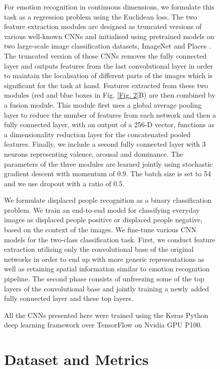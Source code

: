 \documentclass[10pt,twocolumn,letterpaper]{article}
\begin{document}
\begin{figure}[t!]
For emotion recognition in continuous dimensions, we formulate this task as a regression problem using the Euclidean loss. The two feature extraction modules are designed as truncated versions of various well-known CNNs and initialised using pretrained models on two large-scale image classification datasets, ImageNet \cite{krizhevsky2012imagenet} and Places \cite{zhou2018places}. The truncated version of those CNNs removes the fully connected layer and outputs features from the last convolutional layer in order to maintain the localisation of different parts of the images which is significant for the task at hand. Features extracted from these two modules (red and blue boxes in Fig. \ref{Fig. 2}B) are then combined by a fusion module. This module first uses a global average pooling layer to reduce the number of features from each network and then a fully connected layer, with an output of a 256-D vector,  functions as a dimensionality reduction layer for the concatenated pooled features. Finally, we include a second fully connected layer with 3 neurons representing valence, arousal and dominance. The parameters of the three modules are learned jointly using stochastic gradient descent with momentum of 0.9. The batch size is set to 54 and we use dropout with a ratio of 0.5.

We formulate displaced people recognition as a binary classification problem. We train an end-to-end model for classifying everyday images as displaced people positive or displaced people negative, based on the context of the images. We fine-tune various CNN models for the two-class classification task. First, we conduct feature extraction utilising only the convolutional base of the original networks in order to end up with more generic representations as well as retaining spatial information similar to emotion recognition pipeline. The second phase consists of unfreezing some of the top layers of the convolutional base and jointly training a newly added fully connected layer and these top layers.

All the CNNs presented here were trained using the Keras Python deep learning framework \cite{chollet2015keras} over TensorFlow \cite{abadi2016tensorflow} on Nvidia GPU P100.


\section{Dataset and Metrics}


\end{figure}
\end{document}
